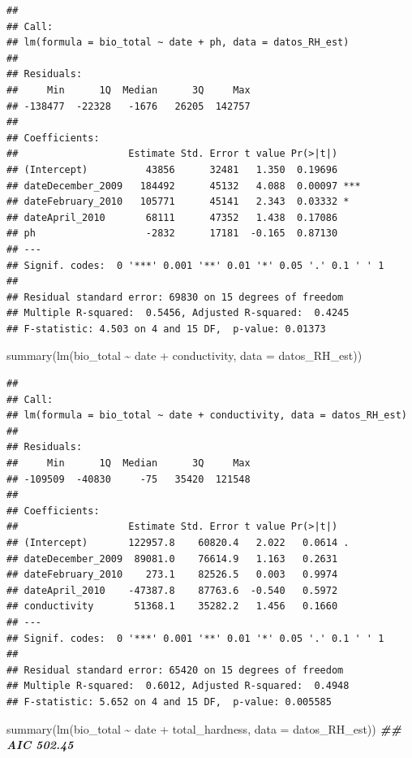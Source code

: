 \documentclass[
]{book}
\newenvironment{Shaded}{\begin{snugshade}}{\end{snugshade}}
\newcommand{\AttributeTok}[1]{\textcolor[rgb]{0.77,0.63,0.00}{#1}}
\newcommand{\DocumentationTok}[1]{\textcolor[rgb]{0.56,0.35,0.01}{\textbf{\textit{#1}}}}
\newcommand{\FunctionTok}[1]{\textcolor[rgb]{0.00,0.00,0.00}{#1}}
\newcommand{\NormalTok}[1]{#1}
\newcommand{\SpecialCharTok}[1]{\textcolor[rgb]{0.00,0.00,0.00}{#1}}
\begin{document}
\begin{verbatim}
## 
## Call:
## lm(formula = bio_total ~ date + ph, data = datos_RH_est)
## 
## Residuals:
##     Min      1Q  Median      3Q     Max 
## -138477  -22328   -1676   26205  142757 
## 
## Coefficients:
##                   Estimate Std. Error t value Pr(>|t|)    
## (Intercept)          43856      32481   1.350  0.19696    
## dateDecember_2009   184492      45132   4.088  0.00097 ***
## dateFebruary_2010   105771      45141   2.343  0.03332 *  
## dateApril_2010       68111      47352   1.438  0.17086    
## ph                   -2832      17181  -0.165  0.87130    
## ---
## Signif. codes:  0 '***' 0.001 '**' 0.01 '*' 0.05 '.' 0.1 ' ' 1
## 
## Residual standard error: 69830 on 15 degrees of freedom
## Multiple R-squared:  0.5456, Adjusted R-squared:  0.4245 
## F-statistic: 4.503 on 4 and 15 DF,  p-value: 0.01373
\end{verbatim}

\begin{Shaded}
\begin{Highlighting}[]
\FunctionTok{summary}\NormalTok{(}\FunctionTok{lm}\NormalTok{(bio\_total }\SpecialCharTok{\textasciitilde{}}\NormalTok{ date }\SpecialCharTok{+}\NormalTok{ conductivity, }\AttributeTok{data =}\NormalTok{ datos\_RH\_est))}
\end{Highlighting}
\end{Shaded}

\begin{verbatim}
## 
## Call:
## lm(formula = bio_total ~ date + conductivity, data = datos_RH_est)
## 
## Residuals:
##     Min      1Q  Median      3Q     Max 
## -109509  -40830     -75   35420  121548 
## 
## Coefficients:
##                   Estimate Std. Error t value Pr(>|t|)  
## (Intercept)       122957.8    60820.4   2.022   0.0614 .
## dateDecember_2009  89081.0    76614.9   1.163   0.2631  
## dateFebruary_2010    273.1    82526.5   0.003   0.9974  
## dateApril_2010    -47387.8    87763.6  -0.540   0.5972  
## conductivity       51368.1    35282.2   1.456   0.1660  
## ---
## Signif. codes:  0 '***' 0.001 '**' 0.01 '*' 0.05 '.' 0.1 ' ' 1
## 
## Residual standard error: 65420 on 15 degrees of freedom
## Multiple R-squared:  0.6012, Adjusted R-squared:  0.4948 
## F-statistic: 5.652 on 4 and 15 DF,  p-value: 0.005585
\end{verbatim}

\begin{Shaded}
\begin{Highlighting}[]
\FunctionTok{summary}\NormalTok{(}\FunctionTok{lm}\NormalTok{(bio\_total }\SpecialCharTok{\textasciitilde{}}\NormalTok{ date }\SpecialCharTok{+}\NormalTok{ total\_hardness, }\AttributeTok{data =}\NormalTok{ datos\_RH\_est)) }\DocumentationTok{\#\# AIC 502.45}
\end{Highlighting}
\end{Shaded}
\end{document}
